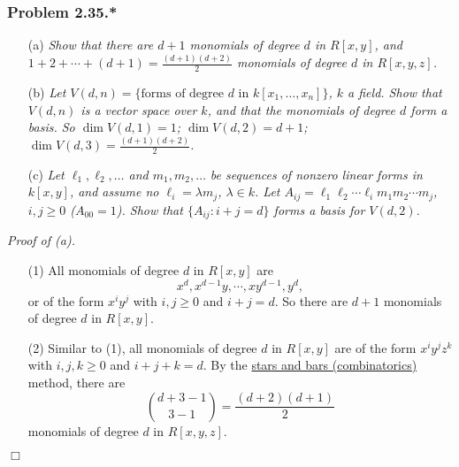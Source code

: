 \documentclass{article}
\begin{document}
\subsubsection*{Problem 2.35.*}
\begin{enumerate}
\item[(a)]
  \emph{Show that there are $d + 1$ monomials of degree $d$ in $R[x,y]$,
  and $1 + 2 + \cdots + (d+1) = \frac{(d+1)(d+2)}{2}$ monomials of degree $d$ in $R[x,y,z]$.}

\item[(b)]
  \emph{Let $V(d,n) = \{\text{forms of degree $d$ in $k[x_1,\ldots,x_n]$} \}$, $k$ a field.
  Show that $V(d,n)$ is a vector space over $k$,
  and that the monomials of degree $d$ form a basis.
  So $\dim V(d,1) = 1$; $\dim V(d,2) = d+1$; $\dim V(d,3) = \frac{(d+1)(d+2)}{2}$.}

\item[(c)]
  \emph{Let $\ell_1, \ell_2, \ldots$ and $m_1, m_2, \ldots$
  be sequences of nonzero linear forms in $k[x,y]$,
  and assume no $\ell_i = \lambda m_j$, $\lambda \in k$.
  Let $A_{ij} = \ell_1 \ell_2 \cdots \ell_i m_1 m_2 \cdots m_j$, $i, j \geq 0$ ($A_{00} = 1$).
  Show that $\{ A_{ij} : i+j=d \}$ forms a basis for $V(d,2)$.} \\
\end{enumerate}



\emph{Proof of (a).}
\begin{enumerate}
\item[(1)]
  All monomials of degree $d$ in $R[x,y]$ are
  \[
    x^d, x^{d-1} y, \cdots, x y^{d-1}, y^d,
  \]
  or of the form $x^i y^j$ with $i, j \geq 0$ and $i + j = d$.
  So there are $d + 1$ monomials of degree $d$ in $R[x,y]$.

\item[(2)]
  Similar to (1), all monomials of degree $d$ in $R[x,y]$ are
  of the form $x^i y^j z^k$ with $i, j, k \geq 0$ and $i + j + k = d$.
  By the \href{https://en.wikipedia.org/wiki/Stars_and_bars_%28combinatorics%29}
  {stars and bars (combinatorics)} method,
  there are
  \[
    {d+3-1 \choose 3-1} = \frac{(d+2)(d+1)}{2}
  \]
  monomials of degree $d$ in $R[x,y,z]$.
\end{enumerate}
$\Box$ \\
\end{document}
